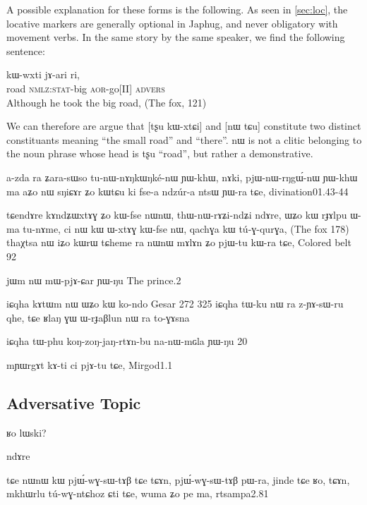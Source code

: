 \documentclass[oldfontcommands,oneside,a4paper,11pt]{memoir}
\newcommand{\ipa}[1]{{\phon #1}} %
\newcommand{\advers}{\textsc{advers}}
\newcommand{\aor}{\textsc{aor}}
\newcommand{\nmlz}{\textsc{nmlz}}
\newcommand{\stat}{\textsc{stat}}
\begin{document}
 A possible explanation for these forms is the following.  As seen in \ref{sec:loc},  the locative markers are generally optional in Japhug, and never obligatory with movement verbs.  In the same story by the same speaker, we find the following sentence:

\begin{exe}	
\ex	
\gll   \ipa{tʂu}  	\ipa{kɯ-wxti}  	\ipa{jɤ-ari}  	\ipa{ri,}  \\
    road \nmlz{}:\stat{}-big \aor{}-go[II] \advers{} \\
 \glt 	Although he took the big road,    (The fox,  121)
\end{exe} 	


We can therefore are argue that [\ipa{tʂu} \ipa{kɯ-xtɕi}] and [\ipa{nɯ} \ipa{tɕu}]  constitute two distinct constituants meaning ``the small road'' and ``there''. \ipa{nɯ} is not a clitic belonging to the noun phrase whose head is \ipa{tʂu} ``road'', but rather a demonstrative.
 


 
 a-zda ra ʑara-sɯso tu-nɯ-nɤŋkɯŋké-nɯ ɲɯ-khɯ, nɤki, pjɯ-nɯ-rŋgɯ́-nɯ ɲɯ-khɯ ma aʑo nɯ sŋiɕɤr ʑo kɯtɕu ki fse-a ndzúr-a ntsɯ ɲɯ-ra tɕe,
 divination01.43-44

tɕendɤre	kɤndʑɯxtɤɣ	ʑo	kɯ-fse	nɯnɯ,	thɯ-nɯ-rɤʑi-ndʑi	ndɤre,
ɯʑo	kɯ	rɟɤlpu	ɯ-ma	tu-nɤme,	ci	nɯ	kɯ	ɯ-xtɤɣ	kɯ-fse	nɯ,	qachɣa	kɯ	tú-ɣ-qurɣa,
(The fox 178) 
thaχtsa	nɯ	iʑo	kɯrɯ	tɕheme	ra	nɯnɯ	mɤlɤn	ʑo	pjɯ-tu	kɯ-ra	tɕe,
Colored belt 92

jɯm	nɯ	mɯ-pjɤ-ɕar	ɲɯ-ŋu
The prince.2



iɕqha	       kɤtɯm	nɯ	ɯʑo	kɯ	ko-ndo
Gesar 272
325	iɕqha	tɯ-ku	nɯ	ra	z-ɲɤ-sɯ-ru	qhe,	tɕe	ʁlaŋ	ɣɯ	ɯ-rɟaβlun	nɯ	ra	to-ɣɤsna
 

iɕqha	tɯ-phu	koŋ-zoŋ-jaŋ-rtɤn-bu	na-nɯ-mɢla	ɲɯ-ŋu	
20


mɲɯrgɤt kɤ-ti ci pjɤ-tu tɕe,
Mirgod1.1

\subsection{Adversative Topic}


ʁo lɯski?

ndɤre

 tɕe nɯnɯ kɯ pjɯ́-wɣ-sɯ-tɤβ tɕe tɕɤn,
 pjɯ́-wɣ-sɯ-tɤβ pɯ-ra, jinde tɕe ʁo, tɕɤn, 
 mkhɯrlu tú-wɣ-ntɕhoz ɕti tɕe, wuma ʑo pe ma,
rtsampa2.81 
 
\end{document}
